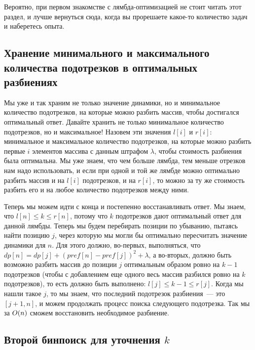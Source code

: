 Вероятно, при первом знакомстве с лямбда-оптимизацией не стоит читать этот раздел, и лучше вернуться сюда, когда вы прорешаете какое-то количество задач и наберетесь опыта.

\subsection{Хранение минимального и максимального количества подотрезков в оптимальных разбиениях}

Мы уже и так храним не только значение динамики, но и минимальное количество подотрезков, на которые можно разбить массив, чтобы достигался оптимальный ответ. Давайте хранить не только минимальное количество подотрезков, но и максимальное! Назовем эти значения $l[i]$ и $r[i]$: минимальное и максимальное количество подотрезков, на которые можно разбить первые $i$ элементов массива с данным штрафом $\lambda$, чтобы стоимость разбиения была оптимальна. Мы уже знаем, что чем больше лямбда, тем меньше отрезков нам надо использовать, и если при одной и той же лямбде можно оптимально разбить массив и на $l[i]$ подотрезков, и на $r[i]$, то можно за ту же стоимость разбить его и на любое количество подотрезков между ними.

Теперь мы можем идти с конца и постепенно восстанавливать ответ. Мы знаем, что $l[n] \le k \le r[n]$, потому что $k$ подотрезков дают оптимальный ответ для данной лямбды. Теперь мы будем перебирать позиции по убыванию, пытаясь найти позицию $j$, через которую мы могли бы оптимально пересчитать значение динамики для $n$. Для этого должно, во-первых, выполняться, что $dp[n] = dp[j]  + (pref[n] - pref[j])^2 + \lambda$, а во-вторых, должно быть возможно разбить массив до позиции $j$ оптимальным образом ровно на $k - 1$ подотрезков (чтобы с добавлением еще одного весь массив разбился ровно на $k$ подотрезков), то есть должно быть выполнено: $l[j] \le k - 1 \le r[j]$. Когда мы нашли такое $j$, то мы знаем, что последний подотрезок разбиения~--- это $[j + 1, n]$, и можем продолжать процесс поиска следующего подотрезка. Так мы за $O(n)$ сможем восстановить необходимое разбиение.

\subsection{Второй бинпоиск для уточнения $k$}

